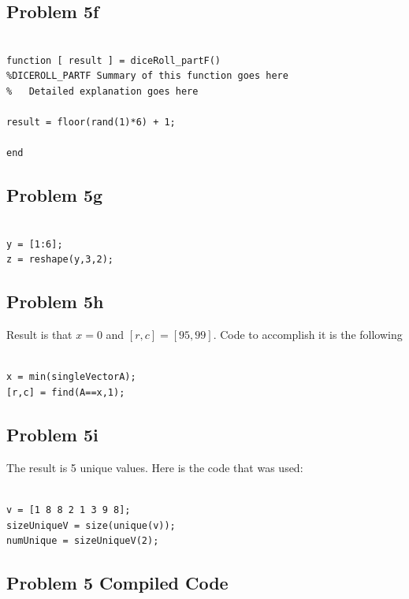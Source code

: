 \documentclass[11pt,psfig]{article}
\begin{document}
\subsection*{Problem 5f}

\begin{verbatim}

function [ result ] = diceRoll_partF()
%DICEROLL_PARTF Summary of this function goes here
%   Detailed explanation goes here

result = floor(rand(1)*6) + 1;

end

\end{verbatim}

\subsection*{Problem 5g}

\begin{verbatim}

y = [1:6];
z = reshape(y,3,2);

\end{verbatim}

\subsection*{Problem 5h}

Result is that $x=0$ and $[r,c]=[95,99]$. Code to accomplish it is the following

\begin{verbatim}

x = min(singleVectorA);
[r,c] = find(A==x,1);

\end{verbatim}

\subsection*{Problem 5i}

The result is 5 unique values. Here is the code that was used:

\begin{verbatim}

v = [1 8 8 2 1 3 9 8];
sizeUniqueV = size(unique(v));
numUnique = sizeUniqueV(2);

\end{verbatim}

\subsection*{Problem 5 Compiled Code}
\end{document}
